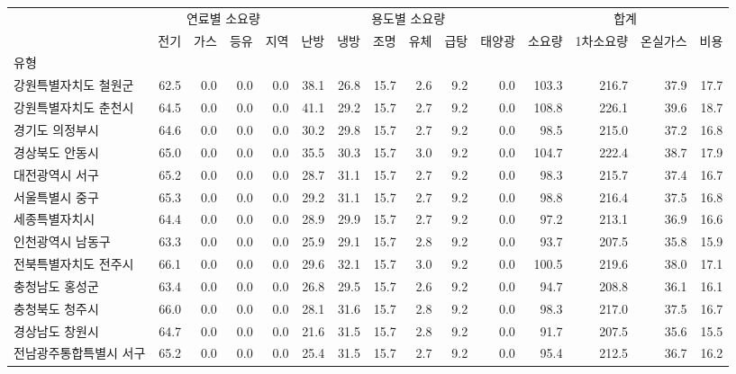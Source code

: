 \begin{defaulttable}
\tiny
\caption{기상데이터별 ASHRAE 140-modified 시뮬레이션 결과}

\begin{tabular}{lrrrrrrrrrrrrrr}
\toprule
 & \multicolumn{4}{|c}{연료별 소요량} & \multicolumn{6}{|c}{용도별 소요량} & \multicolumn{4}{|c}{합계} \\
 & 전기 & 가스 & 등유 & 지역 & 난방 & 냉방 & 조명 & 유체 & 급탕 & 태양광 & 소요량 & 1차소요량 & 온실가스 & 비용 \\
유형 &  &  &  &  &  &  &  &  &  &  &  &  &  &  \\
\midrule
강원특별자치도 철원군 & 62.5 & 0.0 & 0.0 & 0.0 & 38.1 & 26.8 & 15.7 & 2.6 & 9.2 & 0.0 & 103.3 & 216.7 & 37.9 & 17.7 \\
강원특별자치도 춘천시 & 64.5 & 0.0 & 0.0 & 0.0 & 41.1 & 29.2 & 15.7 & 2.7 & 9.2 & 0.0 & 108.8 & 226.1 & 39.6 & 18.7 \\
경기도 의정부시 & 64.6 & 0.0 & 0.0 & 0.0 & 30.2 & 29.8 & 15.7 & 2.7 & 9.2 & 0.0 & 98.5 & 215.0 & 37.2 & 16.8 \\
경상북도 안동시 & 65.0 & 0.0 & 0.0 & 0.0 & 35.5 & 30.3 & 15.7 & 3.0 & 9.2 & 0.0 & 104.7 & 222.4 & 38.7 & 17.9 \\
대전광역시 서구 & 65.2 & 0.0 & 0.0 & 0.0 & 28.7 & 31.1 & 15.7 & 2.7 & 9.2 & 0.0 & 98.3 & 215.7 & 37.4 & 16.7 \\
서울특별시 중구 & 65.3 & 0.0 & 0.0 & 0.0 & 29.2 & 31.1 & 15.7 & 2.7 & 9.2 & 0.0 & 98.8 & 216.4 & 37.5 & 16.8 \\
세종특별자치시 & 64.4 & 0.0 & 0.0 & 0.0 & 28.9 & 29.9 & 15.7 & 2.7 & 9.2 & 0.0 & 97.2 & 213.1 & 36.9 & 16.6 \\
인천광역시 남동구 & 63.3 & 0.0 & 0.0 & 0.0 & 25.9 & 29.1 & 15.7 & 2.8 & 9.2 & 0.0 & 93.7 & 207.5 & 35.8 & 15.9 \\
전북특별자치도 전주시 & 66.1 & 0.0 & 0.0 & 0.0 & 29.6 & 32.1 & 15.7 & 3.0 & 9.2 & 0.0 & 100.5 & 219.6 & 38.0 & 17.1 \\
충청남도 홍성군 & 63.4 & 0.0 & 0.0 & 0.0 & 26.8 & 29.5 & 15.7 & 2.6 & 9.2 & 0.0 & 94.7 & 208.8 & 36.1 & 16.1 \\
충청북도 청주시 & 66.0 & 0.0 & 0.0 & 0.0 & 28.1 & 31.6 & 15.7 & 2.8 & 9.2 & 0.0 & 98.3 & 217.0 & 37.5 & 16.7 \\
경상남도 창원시 & 64.7 & 0.0 & 0.0 & 0.0 & 21.6 & 31.5 & 15.7 & 2.8 & 9.2 & 0.0 & 91.7 & 207.5 & 35.6 & 15.5 \\
전남광주통합특별시 서구 & 65.2 & 0.0 & 0.0 & 0.0 & 25.4 & 31.5 & 15.7 & 2.7 & 9.2 & 0.0 & 95.4 & 212.5 & 36.7 & 16.2 \\

\end{tabular}
\end{defaulttable}
